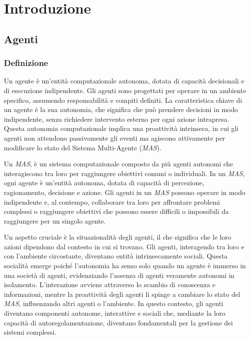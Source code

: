 \section{Introduzione}

\subsection{Agenti}

\subsubsection{Definizione}
Un agente è un'entità computazionale autonoma, dotata di capacità decisionali e di esecuzione indipendente. Gli agenti sono progettati per operare in un ambiente specifico, assumendo responsabilità e compiti definiti. La caratteristica chiave di un agente è la sua autonomia, che significa che può prendere decisioni in modo indipendente, senza richiedere intervento esterno per ogni azione intrapresa. Questa autonomia computazionale implica una proattività intrinseca, in cui gli agenti non attendono passivamente gli eventi ma agiscono attivamente per modificare lo stato del Sistema Multi-Agente (\textit{MAS}).

Un \textit{MAS}, è un sistema computazionale composto da più agenti autonomi che interagiscono tra loro per raggiungere obiettivi comuni o individuali. In un \textit{MAS}, ogni agente è un'entità autonoma, dotata di capacità di percezione, ragionamento, decisione e azione. Gli agenti in un \textit{MAS} possono operare in modo indipendente e, al contempo, collaborare tra loro per affrontare problemi complessi o raggiungere obiettivi che possono essere difficili o impossibili da raggiungere per un singolo agente.

Un aspetto cruciale è la situazionalità degli agenti, il che significa che le loro azioni dipendono dal contesto in cui si trovano. Gli agenti, interagendo tra loro e con l'ambiente circostante, diventano entità intrinsecamente sociali. Questa socialità emerge poiché l'autonomia ha senso solo quando un agente è immerso in una società di agenti, evidenziando l'assenza di agenti veramente autonomi in isolamento. L'interazione avviene attraverso lo scambio di conoscenza e informazioni, mentre la proattività degli agenti li spinge a cambiare lo stato del \textit{MAS}, influenzando altri agenti o l'ambiente. In questo contesto, gli agenti diventano componenti autonome, interattive e sociali che, mediante la loro capacità di autoregolamentazione, diventano fondamentali per la gestione dei sistemi complessi.

